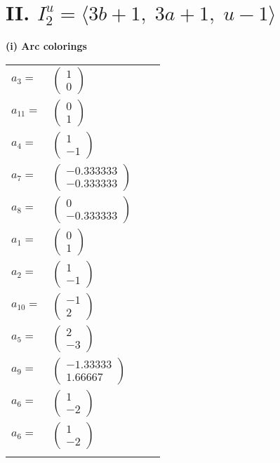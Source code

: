 \documentclass[1p]{elsarticle_modified}
\theoremstyle{definition}
\begin{document}
\centering \section*{II. $I^u_{2}= \langle 3 b+1,\;3 a+1,\;u-1 \rangle$}
\flushleft \textbf{(i) Arc colorings}\\
\begin{tabular}{m{7pt} m{180pt} m{7pt} m{180pt} }
\flushright $a_{3}=$&$\begin{pmatrix}1\\0\end{pmatrix}$ \\
\flushright $a_{11}=$&$\begin{pmatrix}0\\1\end{pmatrix}$ \\
\flushright $a_{4}=$&$\begin{pmatrix}1\\-1\end{pmatrix}$ \\
\flushright $a_{7}=$&$\begin{pmatrix}-0.333333\\-0.333333\end{pmatrix}$ \\
\flushright $a_{8}=$&$\begin{pmatrix}0\\-0.333333\end{pmatrix}$ \\
\flushright $a_{1}=$&$\begin{pmatrix}0\\1\end{pmatrix}$ \\
\flushright $a_{2}=$&$\begin{pmatrix}1\\-1\end{pmatrix}$ \\
\flushright $a_{10}=$&$\begin{pmatrix}-1\\2\end{pmatrix}$ \\
\flushright $a_{5}=$&$\begin{pmatrix}2\\-3\end{pmatrix}$ \\
\flushright $a_{9}=$&$\begin{pmatrix}-1.33333\\1.66667\end{pmatrix}$ \\
\flushright $a_{6}=$&$\begin{pmatrix}1\\-2\end{pmatrix}$\\ \flushright $a_{6}=$&$\begin{pmatrix}1\\-2\end{pmatrix}$\\&\end{tabular}
\end{document}
